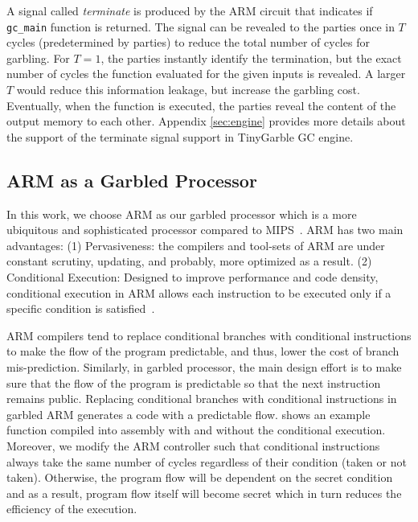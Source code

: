 A signal called \textit{terminate} is produced by the ARM circuit that indicates if \texttt{gc\_main} function is returned.
The signal can be revealed to the parties once in $T$ cycles (predetermined by parties) to reduce the total number of cycles for garbling.
For $T=1$, the parties instantly identify the termination, but the exact number of cycles the function evaluated for the given inputs is revealed.
A larger $T$ would reduce this information leakage, but increase the garbling cost.
Eventually, when the function is executed, the parties reveal the content of the output memory to each other.
Appendix \ref{sec:engine} provides more details about the support of the terminate signal support in TinyGarble GC engine.

\subsection{ARM as a Garbled Processor}\label{ssec:arm}
In this work, we choose ARM as our garbled processor which is a more ubiquitous and sophisticated processor compared to MIPS~\cite{songhori2015tinygarble, wang2015secure, songhori2016garbledcpu}.
ARM has two main advantages:
(1) Pervasiveness: the compilers and tool-sets of ARM are under constant scrutiny, updating, and probably, more optimized as a result.
(2) Conditional Execution: Designed to improve performance and code density, conditional execution in ARM allows each instruction to be executed only if a specific condition is satisfied~\cite{sloss2004arm}.

ARM compilers tend to replace conditional branches with conditional instructions to make the flow of the program predictable, and thus, lower the cost of branch mis-prediction.
Similarly, in garbled processor, the main design effort is to make sure that the flow of the program is predictable so that the next instruction remains public.
Replacing conditional branches with conditional instructions in garbled ARM generates a code with a predictable flow.
 shows an example function compiled into assembly with and without the conditional execution.
Moreover, we modify the ARM controller such that conditional instructions always take the same number of cycles regardless of their condition (taken or not taken). Otherwise, the program flow will be dependent on the secret condition and as a result, program flow itself will become secret which in turn reduces the efficiency of the execution.

